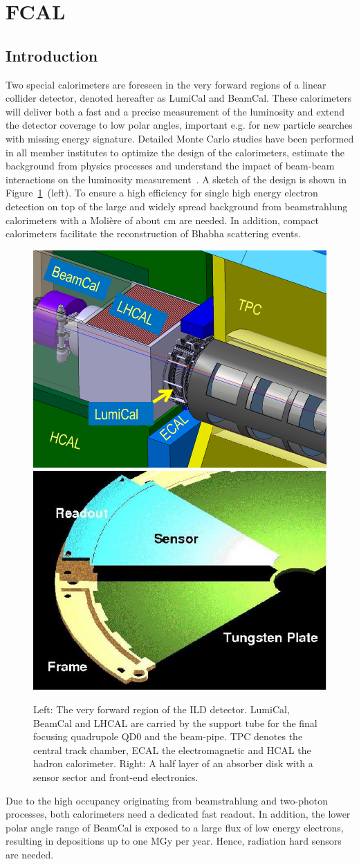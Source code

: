 \section{FCAL}
\subsection{Introduction}
Two special calorimeters are foreseen in the very forward regions of a linear collider detector, denoted hereafter as
LumiCal and BeamCal.
These calorimeters will deliver both a fast and a precise measurement of the luminosity
and extend the detector coverage to low polar angles,
important e.g. for new particle searches with missing energy signature.
Detailed Monte Carlo studies have been performed in all member institutes to
optimize the design of the calorimeters, estimate the background from physics processes and understand the impact
of beam-beam interactions on the luminosity measurement~\cite{2010JInst...512002A}.
A sketch of the design is shown in Figure~\ref{fig:Forward_structure}~(left).
To ensure a high efficiency for single high energy electron detection on top of the large and widely spread
background from beamstrahlung calorimeters with a Moli{\`e}re of about \unit[1]{cm} are needed. In addition, compact calorimeters facilitate
the reconstruction of Bhabha scattering events.
\begin{figure}[hbp]
  \centering
   \includegraphics[width=0.45\columnwidth]{Calorimeter/FCAL/figs/forward_region_new} \hfill
   \includegraphics[width=0.45\columnwidth]{Calorimeter/FCAL/figs/BClayer}
  \caption{Left: The very forward region of the ILD detector.
  LumiCal, BeamCal and LHCAL are carried by
  the support tube for the final focusing quadrupole QD0 and the beam-pipe.
  TPC denotes the central track chamber, ECAL the electromagnetic and
  HCAL the hadron calorimeter.
  Right: A half layer of an absorber disk with a sensor sector and front-end electronics.}
  \label{fig:Forward_structure}
\end{figure}
Due to the high occupancy originating from beamstrahlung and two-photon processes,
both calorimeters need a dedicated fast readout.
In addition, the lower polar angle range of BeamCal is exposed to a large flux
of low energy electrons, resulting in depositions up to one
MGy per year. Hence, radiation hard sensors are needed.

